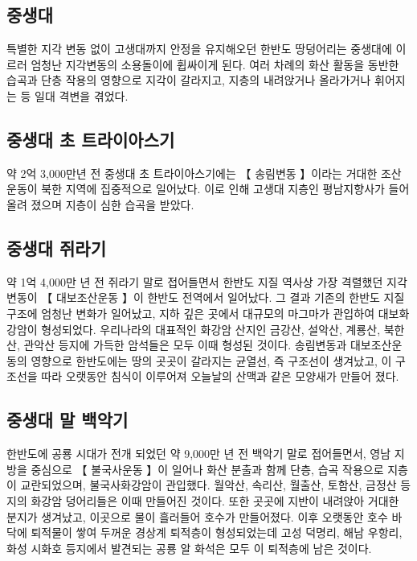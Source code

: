 \documentclass[12pt,a4paper]{book}
\begin{document}
		\subsection{중생대}
특별한 지각 변동 없이 고생대까지 안정을 유지해오던 한반도 땅덩어리는 중생대에 이르러 엄청난 지각변동의 소용돌이에 휩싸이게 된다. 여러 차례의 화산 활동을 동반한 습곡과 단층 작용의 영향으로 지각이 갈라지고, 지층의 내려앉거나 올라가거나 휘어지는 등 일대 격변을 겪었다. \\

		\subsection{중생대 초 트라이아스기}

				약 2억 3,000만년 전 중생대 초 트라이아스기에는 
				【 송림변동 】이라는 거대한 조산 운동이 북한 지역에 집중적으로 일어났다. 
				이로 인해 고생대 지층인 평남지향사가 들어 올려 졌으며 지층이 심한 습곡을 받았다.\\

		\subsection{중생대  쥐라기}
				약 1억 4,000만 년 전 쥐라기 말로 접어들면서 
				한반도 지질 역사상 가장 격렬했던 지각 변동이 【 대보조산운동 】이 한반도 전역에서 일어났다. 
				그 결과 기존의 한반도 지질 구조에 엄청난 변화가 일어났고, 
				지하 깊은 곳에서 대규모의 마그마가 관입하여 대보화강암이 형성되었다. 
				우리나라의 대표적인 화강암 산지인 금강산, 설악산, 계룡산, 북한산, 관악산 등지에 
				가득한 암석들은 모두 이때 형성된 것이다. 
				송림변동과 대보조산운동의 영향으로 한반도에는 땅의 곳곳이 갈라지는 균열선, 
				즉 구조선이 생겨났고, 
				이 구조선을 따라 오랫동안 침식이 이루어져 오늘날의 산맥과 같은 모양새가 만들어 졌다.



		\subsection{중생대 말 백악기}

				한반도에 공룡 시대가 전개 되었던 약 9,000만 년 전 백악기 말로 접어들면서, 
				영남 지방을 중심으로 【 불국사운동 】이 일어나 
				화산 분출과 함께 단층, 습곡 작용으로 지층이 교란되었으며, 불국사화강암이 관입했다. 
				월악산, 속리산, 월출산, 토함산, 금정산 등지의 화강암 덩어리들은 이때 만들어진 것이다. 
				또한 곳곳에 지반이 내려앉아 거대한 분지가 생겨났고, 
				이곳으로 물이 흘러들어 호수가 만들어졌다. 
				이후 오랫동안 호수 바닥에 퇴적물이 쌓여 두꺼운 경상계 퇴적층이 형성되었는데 
				고성 덕명리, 해남 우항리, 화성 시화호 등지에서 발견되는 공룡 알 화석은 
				모두 이 퇴적층에 남은 것이다.
\end{document}
